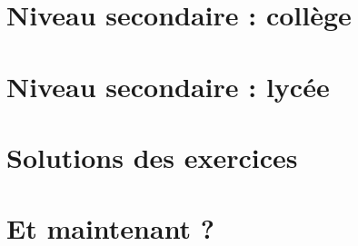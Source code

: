\documentclass[12pt]{memoir}
\begin{document}
\chapter{Niveau secondaire : collège}



\chapter{Niveau secondaire : lycée}






\chapter{Solutions des exercices}







\chapter{Et maintenant ?}



\cleardoublepage
\setcounter{tocdepth}{2}
\renewcommand{\contentsname}{Table des matières détaillée}
\tableofcontents
\cleardoublepage
\renewcommand{\contentsname}{Table des matières}

\cleardoublepage
\renewcommand{\listfigurename}{Liste des figures}
\listoffigures
\end{document}
